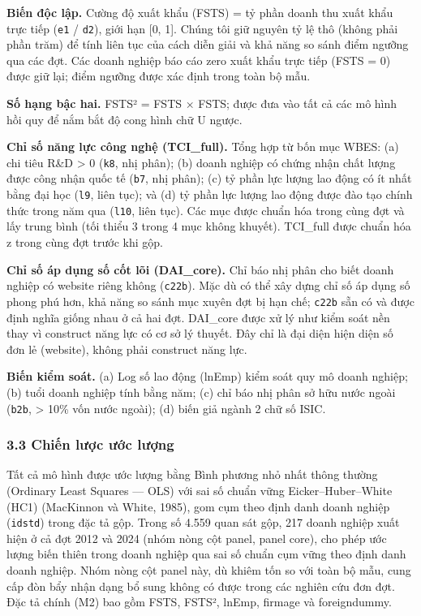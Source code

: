 \documentclass[12pt,a4paper]{article}
\begin{document}
\textbf{Biến độc lập.} Cường độ xuất khẩu (FSTS) = tỷ phần doanh thu
xuất khẩu trực tiếp (\texttt{e1} / \texttt{d2}), giới hạn {[}0, 1{]}.
Chúng tôi giữ nguyên tỷ lệ thô (không phải phần trăm) để tính liên tục
của cách diễn giải và khả năng so sánh điểm ngưỡng qua các đợt. Các
doanh nghiệp báo cáo zero xuất khẩu trực tiếp (FSTS = 0) được giữ lại;
điểm ngưỡng được xác định trong toàn bộ mẫu.

\textbf{Số hạng bậc hai.} FSTS² = FSTS × FSTS; được đưa vào tất cả các
mô hình hồi quy để nắm bắt độ cong hình chữ U ngược.

\textbf{Chỉ số năng lực công nghệ (TCI\_full).} Tổng hợp từ bốn mục
WBES: (a) chi tiêu R\&D \textgreater{} 0 (\texttt{k8}, nhị phân); (b)
doanh nghiệp có chứng nhận chất lượng được công nhận quốc tế
(\texttt{b7}, nhị phân); (c) tỷ phần lực lượng lao động có ít nhất bằng
đại học (\texttt{l9}, liên tục); và (d) tỷ phần lực lượng lao động được
đào tạo chính thức trong năm qua (\texttt{l10}, liên tục). Các mục được
chuẩn hóa trong cùng đợt và lấy trung bình (tối thiểu 3 trong 4 mục
không khuyết). TCI\_full được chuẩn hóa z trong cùng đợt trước khi gộp.

\textbf{Chỉ số áp dụng số cốt lõi (DAI\_core).} Chỉ báo nhị phân cho
biết doanh nghiệp có website riêng không (\texttt{c22b}). Mặc dù có thể
xây dựng chỉ số áp dụng số phong phú hơn, khả năng so sánh mục xuyên đợt
bị hạn chế; \texttt{c22b} sẵn có và được định nghĩa giống nhau ở cả hai
đợt. DAI\_core được xử lý như kiểm soát nền thay vì construct năng lực
có cơ sở lý thuyết. Đây chỉ là đại diện hiện diện số đơn lẻ (website),
không phải construct năng lực.

\textbf{Biến kiểm soát.} (a) Log số lao động (lnEmp) kiểm soát quy mô
doanh nghiệp; (b) tuổi doanh nghiệp tính bằng năm; (c) chỉ báo nhị phân
sở hữu nước ngoài (\texttt{b2b}, \textgreater{} 10\% vốn nước ngoài);
(d) biến giả ngành 2 chữ số ISIC.

\hypertarget{33-chiux1ebfn-lux1b0ux1ee3c-ux1b0ux1edbc-lux1b0ux1ee3ng}{%
\subsubsection{3.3 Chiến lược ước
lượng}\label{33-chiux1ebfn-lux1b0ux1ee3c-ux1b0ux1edbc-lux1b0ux1ee3ng}}

Tất cả mô hình được ước lượng bằng Bình phương nhỏ nhất thông thường
(Ordinary Least Squares --- OLS) với sai số chuẩn vững
Eicker--Huber--White (HC1) (MacKinnon và White, 1985), gom cụm theo định
danh doanh nghiệp (\texttt{idstd}) trong đặc tả gộp. Trong số 4.559 quan
sát gộp, 217 doanh nghiệp xuất hiện ở cả đợt 2012 và 2024 (nhóm nòng cột
panel, panel core), cho phép ước lượng biến thiên trong doanh nghiệp qua
sai số chuẩn cụm vững theo định danh doanh nghiệp. Nhóm nòng cột panel
này, dù khiêm tốn so với toàn bộ mẫu, cung cấp đòn bẩy nhận dạng bổ sung
không có được trong các nghiên cứu đơn đợt. Đặc tả chính (M2) bao gồm
FSTS, FSTS², lnEmp, firmage và foreigndummy.
\end{document}

